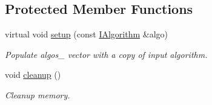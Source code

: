\subsection*{Protected Member Functions}
\begin{DoxyCompactItemize}
\item 
virtual void \hyperlink{classow__core_1_1MatrixAlgorithm_afd178d04dc2dcc1b7717d06ce49d2179}{setup} (const \hyperlink{classow__core_1_1IScalarAlgorithm}{I\+Algorithm} \&algo)\hypertarget{classow__core_1_1MatrixAlgorithm_afd178d04dc2dcc1b7717d06ce49d2179}{}\label{classow__core_1_1MatrixAlgorithm_afd178d04dc2dcc1b7717d06ce49d2179}

\begin{DoxyCompactList}\small\item\em Populate algos\+\_\+ vector with a copy of input algorithm. \end{DoxyCompactList}\item 
void \hyperlink{classow__core_1_1MatrixAlgorithm_a88285ac3f5013790d8a6ab8f18a962ac}{cleanup} ()\hypertarget{classow__core_1_1MatrixAlgorithm_a88285ac3f5013790d8a6ab8f18a962ac}{}\label{classow__core_1_1MatrixAlgorithm_a88285ac3f5013790d8a6ab8f18a962ac}

\begin{DoxyCompactList}\small\item\em Cleanup memory. \end{DoxyCompactList}\end{DoxyCompactItemize}
